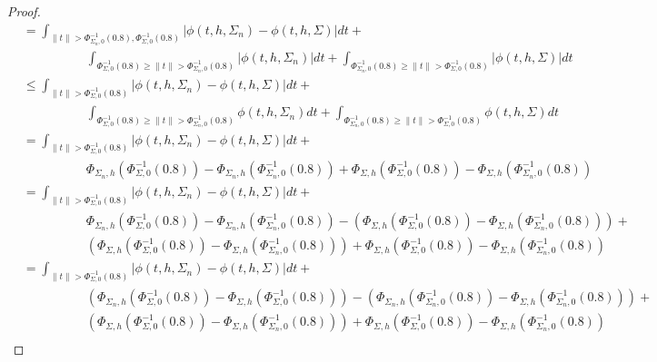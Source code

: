 \documentclass{article}
\begin{document}
\begin{proof}
\begin{align*}
	& = \int_{\|t\| > \Phi^{-1}_{\Sigma_n, 0}(0.8), \Phi^{-1}_{\Sigma, 0}(0.8)} |\phi(t, h, \Sigma_n) - \phi(t, h, \Sigma)|dt + \\
	& \hspace{5em} \int_{\Phi^{-1}_{\Sigma, 0}(0.8) \geq \|t\| > \Phi^{-1}_{\Sigma_n, 0}(0.8)} |\phi(t, h, \Sigma_n)|dt + \int_{\Phi^{-1}_{\Sigma_n, 0}(0.8) \geq \|t\| > \Phi^{-1}_{\Sigma, 0}(0.8)} | \phi(t, h, \Sigma)|dt \\
	& \leq \int_{\|t\| > \Phi^{-1}_{\Sigma, 0}(0.8)} |\phi(t, h, \Sigma_n) - \phi(t, h, \Sigma)|dt + \\
	& \hspace{5em} \int_{\Phi^{-1}_{\Sigma, 0}(0.8) \geq \|t\| > \Phi^{-1}_{\Sigma_n, 0}(0.8)} \phi(t, h, \Sigma_n)dt + \int_{\Phi^{-1}_{\Sigma_n, 0}(0.8) \geq \|t\| > \Phi^{-1}_{\Sigma, 0}(0.8)} \phi(t, h, \Sigma)dt \\
	& = \int_{\|t\| > \Phi^{-1}_{\Sigma, 0}(0.8)} |\phi(t, h, \Sigma_n) - \phi(t, h, \Sigma)|dt + \\
	& \hspace{5em} \Phi_{\Sigma_n, h}(\Phi^{-1}_{\Sigma, 0}(0.8)) - \Phi_{\Sigma_n, h}(\Phi^{-1}_{\Sigma_n, 0}(0.8)) + \Phi_{\Sigma, h}(\Phi^{-1}_{\Sigma, 0}(0.8)) - \Phi_{\Sigma, h}(\Phi^{-1}_{\Sigma_n, 0}(0.8)) \\
	& = \int_{\|t\| > \Phi^{-1}_{\Sigma, 0}(0.8)} |\phi(t, h, \Sigma_n) - \phi(t, h, \Sigma)|dt + \\
	& \hspace{5em} \Phi_{\Sigma_n, h}(\Phi^{-1}_{\Sigma, 0}(0.8)) - \Phi_{\Sigma_n, h}(\Phi^{-1}_{\Sigma_n, 0}(0.8)) - \left(\Phi_{\Sigma, h}(\Phi^{-1}_{\Sigma, 0}(0.8)) - \Phi_{\Sigma, h}(\Phi^{-1}_{\Sigma_n, 0}(0.8))\right)+\\
	& \hspace{5em} \left(\Phi_{\Sigma, h}(\Phi^{-1}_{\Sigma, 0}(0.8)) - \Phi_{\Sigma, h}(\Phi^{-1}_{\Sigma_n, 0}(0.8))\right) +  \Phi_{\Sigma, h}(\Phi^{-1}_{\Sigma, 0}(0.8)) - \Phi_{\Sigma, h}(\Phi^{-1}_{\Sigma_n, 0}(0.8)) \\
	& = \int_{\|t\| > \Phi^{-1}_{\Sigma, 0}(0.8)} |\phi(t, h, \Sigma_n) - \phi(t, h, \Sigma)|dt + \\
	& \hspace{5em} \left(\Phi_{\Sigma_n, h}(\Phi^{-1}_{\Sigma, 0}(0.8)) - \Phi_{\Sigma, h}(\Phi^{-1}_{\Sigma, 0}(0.8)) \right) - \left(\Phi_{\Sigma_n, h}(\Phi^{-1}_{\Sigma_n, 0}(0.8)) -  \Phi_{\Sigma, h}(\Phi^{-1}_{\Sigma_n, 0}(0.8))\right)+\\
	& \hspace{5em} \left(\Phi_{\Sigma, h}(\Phi^{-1}_{\Sigma, 0}(0.8)) - \Phi_{\Sigma, h}(\Phi^{-1}_{\Sigma_n, 0}(0.8))\right) +  \Phi_{\Sigma, h}(\Phi^{-1}_{\Sigma, 0}(0.8)) - \Phi_{\Sigma, h}(\Phi^{-1}_{\Sigma_n, 0}(0.8)) \\
\end{align*}


\end{proof}
\end{document}

